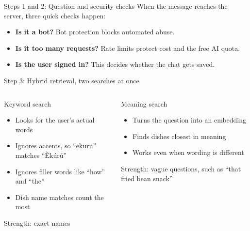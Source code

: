\documentclass[aspectratio=169,11pt]{beamer}
\newcommand{\key}[1]{\textcolor{ember}{\textbf{#1}}}
\begin{document}
\begin{frame}{Steps 1 and 2: Question and security checks}
  When the message reaches the server, three quick checks happen:
  \vspace{0.2cm}
  \begin{itemize}
    \item \key{Is it a bot?} Bot protection blocks automated abuse.
    \item \key{Is it too many requests?} Rate limits protect cost and the free AI quota.
    \item \key{Is the user signed in?} This decides whether the chat gets saved.
  \end{itemize}
\end{frame}

\begin{frame}{Step 3: Hybrid retrieval, two searches at once}
  \begin{columns}[T]
      \begin{block}{Keyword search}
        \begin{itemize}
          \item Looks for the user's actual words
          \item Ignores accents, so ``ekuru'' matches ``Èkúrú''
          \item Ignores filler words like ``how'' and ``the''
          \item Dish name matches count the most
        \end{itemize}
        \alert{Strength:} exact names
      \end{block}
      \begin{block}{Meaning search}
        \begin{itemize}
          \item Turns the question into an embedding
          \item Finds dishes closest in meaning
          \item Works even when wording is different
        \end{itemize}
        \alert{Strength:} vague questions, such as ``that fried bean snack''
      \end{block}
  \end{columns}
  \vspace{0.2cm}
\end{frame}
\end{document}
